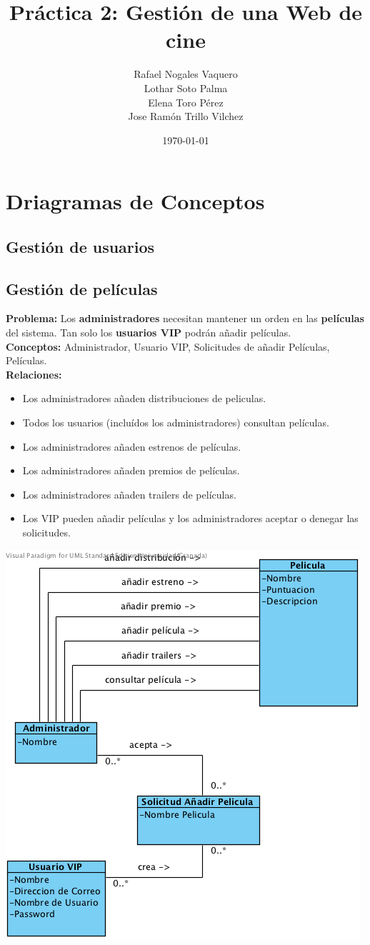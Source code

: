 \documentclass{article}
\title{Práctica 2: Gestión de una Web de cine}
\author{Rafael Nogales Vaquero
\\Lothar Soto Palma
\\Elena Toro Pérez
\\Jose Ramón Trillo Vilchez}
\date{\today}
\begin{document}
\maketitle

\section{Driagramas de Conceptos}
	\subsection*{Gestión de usuarios}


	\subsection*{Gestión de películas}
	\textbf{Problema:} Los \textbf{administradores} necesitan mantener un orden en las \textbf{películas} del sistema.
	 Tan solo los \textbf{usuarios VIP} podrán añadir películas.\\
	\textbf{Conceptos:} Administrador, Usuario VIP, Solicitudes de añadir Películas, Películas.\\
	\textbf{	Relaciones:}
		\begin{itemize}
			\item Los administradores añaden distribuciones de peliculas.
			\item Todos los usuarios (incluídos los administradores) consultan películas.
			\item Los administradores añaden estrenos de películas.
			\item Los administradores añaden premios de películas.
			\item Los administradores añaden trailers de películas.
			\item Los VIP pueden añadir películas y los administradores aceptar o denegar las solicitudes.		
		\end{itemize}
	\includegraphics[width=0.7\linewidth]{./C-GestionDePeliculas}
	
\end{document}
